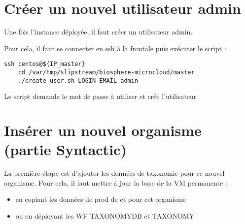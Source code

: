 \section{Créer un nouvel utilisateur admin}

Une fois l'instance déployée, il faut créer un utilisateur admin.

Pour cela, il faut se connecter en ssh à la frontale puis exécuter le script :
\begin{lstlisting}[style=Bash,gobble=4]
    ssh centos@${IP_master}
    cd /var/tmp/slipstream/biosphere-microcloud/master
    ./create_user.sh LOGIN EMAIL admin
\end{lstlisting}
Le script demande le mot de passe à utiliser et crée l'utilisateur

\section{Insérer un nouvel organisme (partie Syntactic)} \label{sec:syntactic}

La première étape est d'ajouter les données de taxonomie pour ce nouvel organisme.
Pour cela, il faut mettre à jour la base  de la VM permanente :
\begin{itemize}
    \item en copiant les données de prod de  et  pour cet organisme
    \item ou en déployant les WF TAXONOMYDB et TAXONOMY
\end{itemize}

